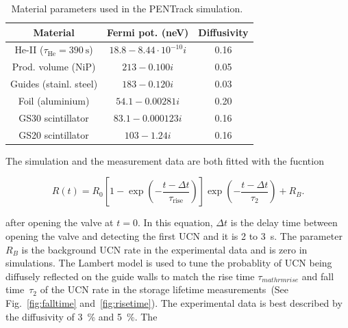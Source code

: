 \begin{table}
  \centering
\begin{tabular}{|c|c|c|}
  \hline
Material & Fermi pot. (neV) & Diffusivity \\
\hline
He-II ($\tau_\mathrm{He} = \SI{390}{\second}$) & $18.8 - 8.44\cdot10^{-10} i$ & 0.16 \\
Prod. volume (NiP) & $213 - 0.100 i$ & 0.05 \\
Guides (stainl. steel) & $183 - 0.120 i$ & 0.03 \\
Foil (aluminium) & $54.1 - 0.00281 i$ & 0.20 \\
GS30 scintillator & $83.1 - 0.000123 i$ & 0.16 \\
  GS20 scintillator & $103 - 1.24 i$ & 0.16 \\
  \hline
\end{tabular}
\caption{Material parameters used in the PENTrack simulation.~\cite{atchison2009transmission,Ban2016,sears1992neutron}}
\label{tab:materials}
\end{table}

The simulation and the measurement data are both fitted with the fucntion

\begin{equation}
R(t) = R_0 \left[ 1 - \exp \left( -\frac{t - \Delta t}{\tau_\mathrm{rise}} \right) \right] \exp \left( -\frac{t - \Delta t}{\tau_2} \right) + R_B.
\end{equation}

after opening the valve at $t=0$. In this equation, $\Delta t$ is the
delay time between opening the valve and detecting the first UCN and
it is 2 to 3~s. The parameter $ R_B$ is the background UCN rate in the
experimental data and is zero in simulations.  The Lambert model is
used to tune the probablity of UCN being diffusely reflected on the
guide walls to match the rise time $\tau_{mathrm{rise}}$ and fall
time~$\tau_2$ of the UCN rate in the storage lifetime
measurements~(See Fig.~\ref{fig:falltime} and~\ref{fig:risetime}).
The experimental data is best described by the diffusivity of 3~\% and 5~\%. The


